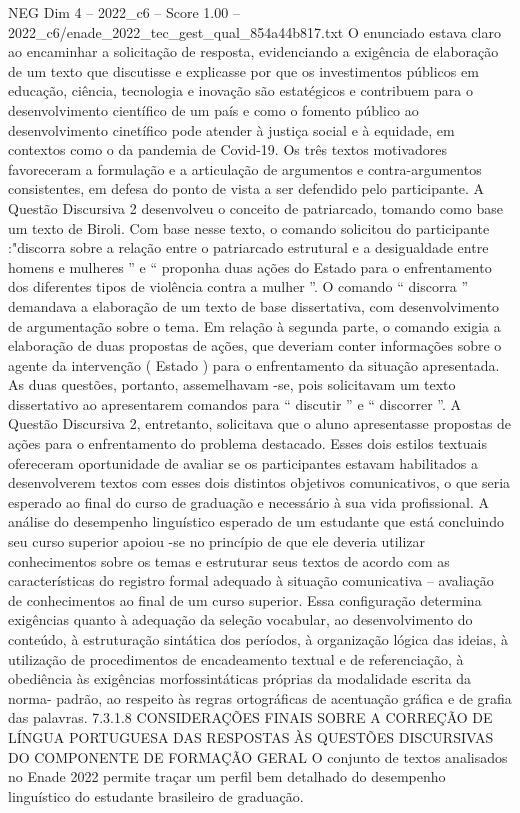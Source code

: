\begin{textsample}{NEG Dim 4 – 2022\_c6 – Score 1.00 – 2022\_c6/enade\_2022\_tec\_gest\_qual\_854a44b817.txt}
O enunciado estava claro ao encaminhar a solicitação de resposta, evidenciando a exigência de elaboração de um texto que discutisse e explicasse por que os investimentos públicos em educação, ciência, tecnologia e inovação são estatégicos e contribuem para o desenvolvimento científico de um país e como o fomento público ao desenvolvimento cinetífico pode atender à justiça social e à equidade, em contextos como o da pandemia de Covid-19.
Os três textos motivadores favoreceram a formulação e a articulação de argumentos e contra-argumentos consistentes, em defesa do ponto de vista a ser defendido pelo participante.
A Questão Discursiva 2 desenvolveu o conceito de patriarcado, tomando como base um texto de Biroli.
Com base nesse texto, o comando solicitou do participante :"discorra sobre a relação entre o patriarcado estrutural e a desigualdade entre homens e mulheres ” e “ proponha duas ações do Estado para o enfrentamento dos diferentes tipos de violência contra a mulher ”.
O comando “ discorra ” demandava a elaboração de um texto de base dissertativa, com desenvolvimento de argumentação sobre o tema.
Em relação à segunda parte, o comando exigia a elaboração de duas propostas de ações, que deveriam conter informações sobre o agente da intervenção ( Estado ) para o enfrentamento da situação apresentada.
As duas questões, portanto, assemelhavam -se, pois solicitavam um texto dissertativo ao apresentarem comandos para “ discutir ” e “ discorrer ”.
A Questão Discursiva 2, entretanto, solicitava que o aluno apresentasse propostas de ações para o enfrentamento do problema destacado.
Esses dois estilos textuais ofereceram oportunidade de avaliar se os participantes estavam habilitados a desenvolverem textos com esses dois distintos objetivos comunicativos, o que seria esperado ao final do curso de graduação e necessário à sua vida profissional.
A análise do desempenho linguístico esperado de um estudante que está concluindo seu curso superior apoiou -se no princípio de que ele deveria utilizar conhecimentos sobre os temas e estruturar seus textos de acordo com as características do registro formal adequado à situação comunicativa – avaliação de conhecimentos ao final de um curso superior.
Essa configuração determina exigências quanto à adequação da seleção vocabular, ao desenvolvimento do conteúdo, à estruturação sintática dos períodos, à organização lógica das ideias, à utilização de procedimentos de encadeamento textual e de referenciação, à obediência às exigências morfossintáticas próprias da modalidade escrita da norma- padrão, ao respeito às regras ortográficas de acentuação gráfica e de grafia das palavras. 7.3.1.8 CONSIDERAÇÕES FINAIS SOBRE A CORREÇÃO DE LÍNGUA PORTUGUESA DAS RESPOSTAS ÀS QUESTÕES DISCURSIVAS DO COMPONENTE DE FORMAÇÃO GERAL O conjunto de textos analisados no Enade 2022 permite traçar um perfil bem detalhado do desempenho linguístico do estudante brasileiro de graduação.

\end{textsample}
